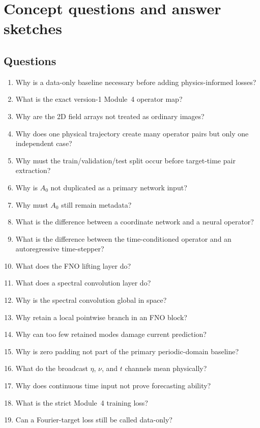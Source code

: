 \documentclass[11pt]{article}
\begin{document}
\section{Concept questions and answer sketches}
\label{app:questions}

\subsection*{Questions}
\begin{enumerate}[label=\textbf{Q\arabic*.}]
  \item Why is a data-only baseline necessary before adding physics-informed losses?
  \item What is the exact version-1 Module~4 operator map?
  \item Why are the 2D field arrays not treated as ordinary images?
  \item Why does one physical trajectory create many operator pairs but only one independent case?
  \item Why must the train/validation/test split occur before target-time pair extraction?
  \item Why is $A_0$ not duplicated as a primary network input?
  \item Why must $A_0$ still remain metadata?
  \item What is the difference between a coordinate network and a neural operator?
  \item What is the difference between the time-conditioned operator and an autoregressive time-stepper?
  \item What does the FNO lifting layer do?
  \item What does a spectral convolution layer do?
  \item Why is the spectral convolution global in space?
  \item Why retain a local pointwise branch in an FNO block?
  \item Why can too few retained modes damage current prediction?
  \item Why is zero padding not part of the primary periodic-domain baseline?
  \item What do the broadcast $\eta$, $\nu$, and $t$ channels mean physically?
  \item Why does continuous time input not prove forecasting ability?
  \item What is the strict Module~4 training loss?
  \item Can a Fourier-target loss still be called data-only?

\end{enumerate}
\end{document}

